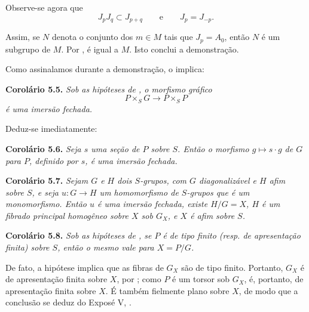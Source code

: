 Observe-se agora que
\[
  J_pJ_q\subset J_{p+q}
  \qquad\text{e}\qquad
  J_p=J_{-p}.
\]

Assim, se \(N\) denota o conjunto dos \(m\in M\) tais que \(J_p=A_0\), então \(N\) é um subgrupo de
\(M\). Por , é igual a \(M\).
Isto conclui a demonstração.

Como assinalamos durante a demonstração, o
 implica:

\medskip
\noindent{}\textbf{Corolário 5.5.}
\textit{Sob as hipóteses de
, o morfismo gráfico}
\[
  P\times_SG\longrightarrow P\times_SP
\]
\textit{é uma imersão fechada.}

Deduz-se imediatamente:

\medskip
\noindent{}\textbf{Corolário 5.6.}
\textit{Seja \(s\) uma seção de \(P\) sobre \(S\). Então o
morfismo \(g\mapsto s\cdot g\) de \(G\) para \(P\), definido por
\(s\), é uma imersão fechada.}

\medskip
\noindent{}\textbf{Corolário 5.7.}
\textit{Sejam \(G\) e \(H\) dois \(S\)-grupos, com \(G\) diagonalizável e
\(H\) afim sobre \(S\), e seja \(u:G\to H\) um homomorfismo de
\(S\)-grupos que é um monomorfismo. Então \(u\) é uma imersão
fechada, existe \(H/G=X\), \(H\) é um fibrado principal homogêneo sobre
\(X\) sob \(G_X\), e \(X\) é afim sobre \(S\).}

\medskip
\noindent{}\textbf{Corolário 5.8.}
\textit{Sob as hipóteses de
, se \(P\) é de tipo finito
(resp. de apresentação finita) sobre \(S\), então o mesmo
vale para \(X=P/G\).}

De fato, a hipótese implica que as fibras de \(G_X\) são de tipo
finito. Portanto, \(G_X\) é de apresentação finita sobre \(X\), por
; como \(P\) é um
torsor sob \(G_X\), é, portanto, de apresentação finita sobre
\(X\). É também
fielmente plano sobre \(X\), de modo que a conclusão se deduz do Exposé
V, .
